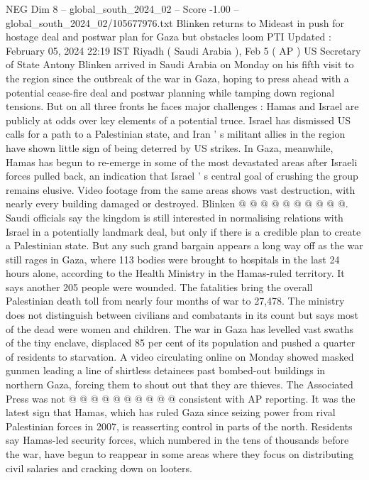 \begin{textsample}{NEG Dim 8 – global\_south\_2024\_02 – Score -1.00 – global\_south\_2024\_02/105677976.txt}  \label{ex:f8_neg_064}
Blinken returns to Mideast in push for hostage deal and postwar plan for Gaza but obstacles loom PTI Updated : February 05, 2024 22:19 IST Riyadh ( Saudi Arabia ), Feb 5 ( AP ) US Secretary of State Antony Blinken arrived in Saudi Arabia on Monday on his fifth visit to the region since the outbreak of the war in Gaza, hoping to press ahead with a potential cease-fire deal and postwar planning while tamping down regional tensions.
But on all three fronts he faces major challenges : Hamas and Israel are publicly at odds over key elements of a potential truce.
Israel has dismissed US calls for a path to a Palestinian state, and Iran ' s militant allies in the region have shown little sign of being deterred by US strikes.
In Gaza, meanwhile, Hamas has begun to re-emerge in some of the most devastated areas after Israeli forces pulled back, an indication that Israel ' s central goal of crushing the group remains elusive.
Video footage from the same areas shows vast destruction, with nearly every building damaged or destroyed.
Blinken @ @ @ @ @ @ @ @ @ @.
Saudi officials say the kingdom is still interested in normalising relations with Israel in a potentially landmark deal, but only if there is a credible plan to create a Palestinian state.
But any such grand bargain appears a long way off as the war still rages in Gaza, where 113 bodies were brought to hospitals in the last 24 hours alone, according to the Health Ministry in the Hamas-ruled territory.
It says another 205 people were wounded.
The fatalities bring the overall Palestinian death toll from nearly four months of war to 27,478.
The ministry does not distinguish between civilians and combatants in its count but says most of the dead were women and children.
The war in Gaza has levelled vast swaths of the tiny enclave, displaced 85 per cent of its population and pushed a quarter of residents to starvation.
A video circulating online on Monday showed masked gunmen leading a line of shirtless detainees past bombed-out buildings in northern Gaza, forcing them to shout out that they are thieves.
The Associated Press was not @ @ @ @ @ @ @ @ @ @ consistent with AP reporting.
It was the latest sign that Hamas, which has ruled Gaza since seizing power from rival Palestinian forces in 2007, is reasserting control in parts of the north.
Residents say Hamas-led security forces, which numbered in the tens of thousands before the war, have begun to reappear in some areas where they focus on distributing civil salaries and cracking down on looters.

\end{textsample}
